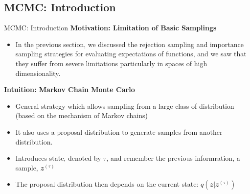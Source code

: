 \documentclass{bredelebeamer}
\begin{document}
\subsection{MCMC: Introduction}
\begin{frame}{MCMC: Introduction}
  \textbf{Motivation: Limitation of Basic Samplings}
  \begin{itemize}
    \item In the previous section, we discussed the rejection sampling and
    importance sampling strategies for evaluating expectations of functions,
    and we saw that they suffer from severe limitations particularly in
    spaces of high dimensionality.
  \end{itemize}

  \textbf{Intuition: Markov Chain Monte Carlo}
  \begin{itemize}
    \item General strategy which allows sampling from a large class of
    distribution (based on the mechanism of Markov chains)
    \item It also uses a proposal distribution to generate samples from
    another distribution.
    \item Introduces state, denoted by $\tau$, and remember the previous
    informration, a sample, $\mathbfit{z}^{(\tau)}$
    \item The proposal distribution then depends on the current state:
    $q(\mathbfit{z}|\mathbfit{z}^{(\tau)})$
  \end{itemize}
\end{frame}
\end{document}
